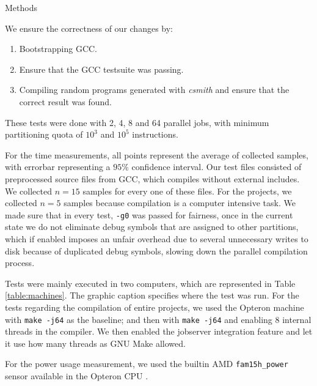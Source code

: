 \begin{subsection}{Methods}\label{sec:methods}

We ensure the correctness of our changes by:

\begin{enumerate}
\item Bootstrapping GCC.
\item Ensure that the GCC testsuite was passing.
\item Compiling random programs generated with \textit{csmith} \citep{csmith}
and ensure that the correct result was found.
\end{enumerate}

These tests were done with 2, 4, 8 and 64 parallel jobs, with minimum
partitioning quota of $10^3$ and $10^5$ instructions.

For the time measurements, all points represent the average of collected
samples, with errorbar representing a $95\%$ confidence interval.  Our test
files consisted of preprocessed source files from GCC, which compiles without
external includes. We collected $n = 15$ samples for every one of these files.
For the projects, we collected $n = 5$ samples because compilation is a
computer intensive task. We made sure that in every test, \texttt{-g0} was
passed for fairness, once in the current state we do not eliminate debug
symbols that are assigned to other partitions, which if enabled imposes an
unfair overhead due to several unnecessary writes to disk because of duplicated
debug symbols, slowing down the parallel compilation process.

Tests were mainly executed in two computers, which are represented in Table
\ref{table:machines}. The graphic caption specifies where the test was run.
For the tests regarding the compilation of entire projects, we used the Opteron
machine with \texttt{make -j64} as the baseline; and then with \texttt{make
-j64} and enabling 8 internal threads in the compiler. We then enabled the
jobserver integration feature and let it use how many threads as GNU Make
allowed.

For the power usage measurement, we used the builtin AMD \texttt{fam15h\_power}
sensor available in the Opteron CPU \citep{fam15h}.


\end{subsection}
